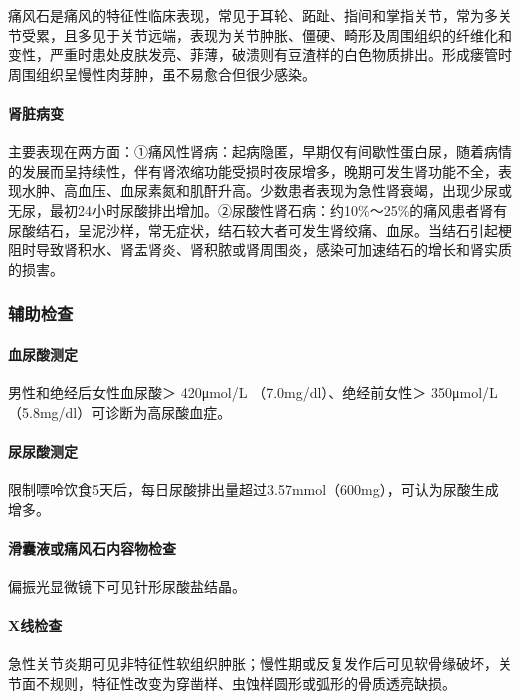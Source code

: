 痛风石是痛风的特征性临床表现，常见于耳轮、跖趾、指间和掌指关节，常为多关节受累，且多见于关节远端，表现为关节肿胀、僵硬、畸形及周围组织的纤维化和变性，严重时患处皮肤发亮、菲薄，破溃则有豆渣样的白色物质排出。形成瘘管时周围组织呈慢性肉芽肿，虽不易愈合但很少感染。

\paragraph{肾脏病变}

主要表现在两方面：①痛风性肾病：起病隐匿，早期仅有间歇性蛋白尿，随着病情的发展而呈持续性，伴有肾浓缩功能受损时夜尿增多，晚期可发生肾功能不全，表现水肿、高血压、血尿素氮和肌酐升高。少数患者表现为急性肾衰竭，出现少尿或无尿，最初24小时尿酸排出增加。②尿酸性肾石病：约10\%～25\%的痛风患者肾有尿酸结石，呈泥沙样，常无症状，结石较大者可发生肾绞痛、血尿。当结石引起梗阻时导致肾积水、肾盂肾炎、肾积脓或肾周围炎，感染可加速结石的增长和肾实质的损害。

\subsubsection{辅助检查}

\paragraph{血尿酸测定}

男性和绝经后女性血尿酸＞ 420μmol/L （7.0mg/dl）、绝经前女性＞
350μmol/L（5.8mg/dl）可诊断为高尿酸血症。

\paragraph{尿尿酸测定}

限制嘌呤饮食5天后，每日尿酸排出量超过3.57mmol（600mg），可认为尿酸生成增多。

\paragraph{滑囊液或痛风石内容物检查}

偏振光显微镜下可见针形尿酸盐结晶。

\paragraph{X线检查}

急性关节炎期可见非特征性软组织肿胀；慢性期或反复发作后可见软骨缘破坏，关节面不规则，特征性改变为穿凿样、虫蚀样圆形或弧形的骨质透亮缺损。

